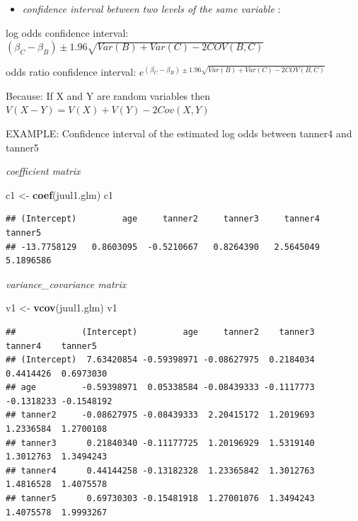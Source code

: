 \documentclass[
]{article}
\newenvironment{Shaded}{\begin{snugshade}}{\end{snugshade}}
\newcommand{\KeywordTok}[1]{\textcolor[rgb]{0.13,0.29,0.53}{\textbf{#1}}}
\newcommand{\NormalTok}[1]{#1}
\newcommand{\StringTok}[1]{\textcolor[rgb]{0.31,0.60,0.02}{#1}}
\providecommand{\tightlist}{%
  \setlength{\itemsep}{0pt}\setlength{\parskip}{0pt}}
\begin{document}
\begin{itemize}
\tightlist
\item
  \emph{confidence interval between two levels of the same variable} :
\end{itemize}

log odds confidence interval:
\((\beta_C - \beta_B) \pm 1.96 \sqrt{Var(B) + Var(C) - 2COV(B,C)}\)

odds ratio confidence interval:
\(e^{(\beta_C - \beta_B) \pm 1.96 \sqrt{Var(B) + Var(C) - 2COV(B,C)}}\)

Because: If X and Y are random variables then
\(V(X-Y) = V(X) + V(Y)- 2Cov(X,Y)\)

EXAMPLE: Confidence interval of the estimated log odds between tanner4
and tanner5

\emph{coefficient matrix}

\begin{Shaded}
\begin{Highlighting}[]
\NormalTok{c1 <-}\StringTok{ }\KeywordTok{coef}\NormalTok{(juul1.glm)}
\NormalTok{c1}
\end{Highlighting}
\end{Shaded}

\begin{verbatim}
## (Intercept)         age     tanner2     tanner3     tanner4     tanner5 
## -13.7758129   0.8603095  -0.5210667   0.8264390   2.5645049   5.1896586
\end{verbatim}

\emph{variance\_covariance matrix}

\begin{Shaded}
\begin{Highlighting}[]
\NormalTok{v1 <-}\StringTok{ }\KeywordTok{vcov}\NormalTok{(juul1.glm)}
\NormalTok{v1}
\end{Highlighting}
\end{Shaded}

\begin{verbatim}
##             (Intercept)         age     tanner2    tanner3    tanner4    tanner5
## (Intercept)  7.63420854 -0.59398971 -0.08627975  0.2184034  0.4414426  0.6973030
## age         -0.59398971  0.05338584 -0.08439333 -0.1117773 -0.1318233 -0.1548192
## tanner2     -0.08627975 -0.08439333  2.20415172  1.2019693  1.2336584  1.2700108
## tanner3      0.21840340 -0.11177725  1.20196929  1.5319140  1.3012763  1.3494243
## tanner4      0.44144258 -0.13182328  1.23365842  1.3012763  1.4816528  1.4075578
## tanner5      0.69730303 -0.15481918  1.27001076  1.3494243  1.4075578  1.9993267
\end{verbatim}
\end{document}
